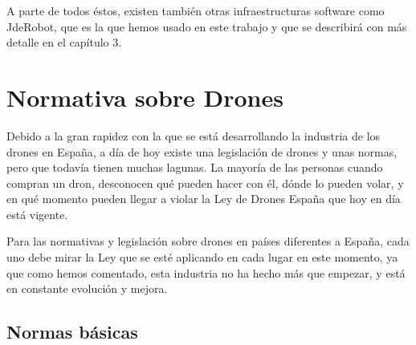 A parte de todos éstos, existen también otras infraestructuras software como
JdeRobot, que es la que hemos usado en este trabajo y que se describirá con más detalle en el capítulo 3.

\section{Normativa sobre Drones}
\label{sec:normativa}

Debido a la gran rapidez con la que se está desarrollando la industria de los drones en España, a día de hoy existe una legislación\cite{normativa} de drones y unas normas, pero que todavía tienen muchas lagunas. La mayoría de las personas cuando compran un dron, desconocen qué pueden hacer con él, dónde lo pueden volar, y en qué momento pueden llegar a violar la Ley de Drones España que hoy en día está vigente.

Para las normativas y legislación sobre drones en países diferentes a España, cada uno debe mirar la Ley que se esté aplicando en cada lugar en este momento, ya que como hemos comentado, esta industria no ha hecho más que empezar, y está en constante evolución y mejora.

\subsection{Normas básicas}

